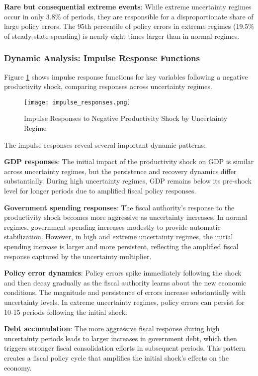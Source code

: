 \documentclass[5p,authoryear]{elsarticle}
\begin{document}
\textbf{Rare but consequential extreme events}: While extreme uncertainty regimes occur in only 3.8\% of periods, they are responsible for a disproportionate share of large policy errors. The 95th percentile of policy errors in extreme regimes (19.5\% of steady-state spending) is nearly eight times larger than in normal regimes.

\subsubsection{Dynamic Analysis: Impulse Response Functions}

Figure \ref{fig:impulse_responses} shows impulse response functions for key variables following a negative productivity shock, comparing responses across uncertainty regimes.

\begin{figure}[h!]
\centering
\texttt{[image: impulse\_responses.png]}
\caption{Impulse Responses to Negative Productivity Shock by Uncertainty Regime}
\label{fig:impulse_responses}
\end{figure}

The impulse responses reveal several important dynamic patterns:

\textbf{GDP responses}: The initial impact of the productivity shock on GDP is similar across uncertainty regimes, but the persistence and recovery dynamics differ substantially. During high uncertainty regimes, GDP remains below its pre-shock level for longer periods due to amplified fiscal policy responses.

\textbf{Government spending responses}: The fiscal authority's response to the productivity shock becomes more aggressive as uncertainty increases. In normal regimes, government spending increases modestly to provide automatic stabilization. However, in high and extreme uncertainty regimes, the initial spending increase is larger and more persistent, reflecting the amplified fiscal response captured by the uncertainty multiplier.

\textbf{Policy error dynamics}: Policy errors spike immediately following the shock and then decay gradually as the fiscal authority learns about the new economic conditions. The magnitude and persistence of errors increase substantially with uncertainty levels. In extreme uncertainty regimes, policy errors can persist for 10-15 periods following the initial shock.

\textbf{Debt accumulation}: The more aggressive fiscal response during high uncertainty periods leads to larger increases in government debt, which then triggers stronger fiscal consolidation efforts in subsequent periods. This pattern creates a fiscal policy cycle that amplifies the initial shock's effects on the economy.
\end{document}
